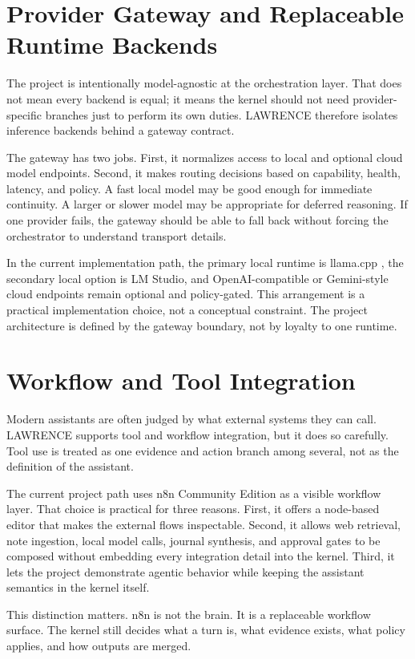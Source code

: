 \documentclass[conference]{IEEEtran}
\begin{document}
\section{Provider Gateway and Replaceable Runtime Backends}
The project is intentionally model-agnostic at the orchestration layer. That does not mean every backend is equal; it means the kernel should not need provider-specific branches just to perform its own duties. LAWRENCE therefore isolates inference backends behind a gateway contract.

The gateway has two jobs. First, it normalizes access to local and optional cloud model endpoints. Second, it makes routing decisions based on capability, health, latency, and policy. A fast local model may be good enough for immediate continuity. A larger or slower model may be appropriate for deferred reasoning. If one provider fails, the gateway should be able to fall back without forcing the orchestrator to understand transport details.

In the current implementation path, the primary local runtime is llama.cpp \cite{llamacpp}, the secondary local option is LM Studio, and OpenAI-compatible or Gemini-style cloud endpoints remain optional and policy-gated. This arrangement is a practical implementation choice, not a conceptual constraint. The project architecture is defined by the gateway boundary, not by loyalty to one runtime.

\section{Workflow and Tool Integration}
Modern assistants are often judged by what external systems they can call. LAWRENCE supports tool and workflow integration, but it does so carefully. Tool use is treated as one evidence and action branch among several, not as the definition of the assistant.

The current project path uses n8n Community Edition \cite{n8n} as a visible workflow layer. That choice is practical for three reasons. First, it offers a node-based editor that makes the external flows inspectable. Second, it allows web retrieval, note ingestion, local model calls, journal synthesis, and approval gates to be composed without embedding every integration detail into the kernel. Third, it lets the project demonstrate agentic behavior while keeping the assistant semantics in the kernel itself.

This distinction matters. n8n is not the brain. It is a replaceable workflow surface. The kernel still decides what a turn is, what evidence exists, what policy applies, and how outputs are merged.
\end{document}
